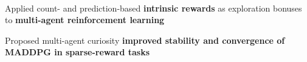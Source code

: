 \documentclass[]{lukas-cv-openfont}
\begin{document}



\noindent
{}
\\
\begin{tightitemize}{1.7em}
    \item Applied count- and prediction-based \textbf{intrinsic rewards} as exploration bonuses to \textbf{multi-agent reinforcement learning}
    \item Proposed multi-agent curiosity \textbf{improved stability and convergence of MADDPG in sparse-reward tasks}
\end{tightitemize}
\largesectionsep

\end{document}
